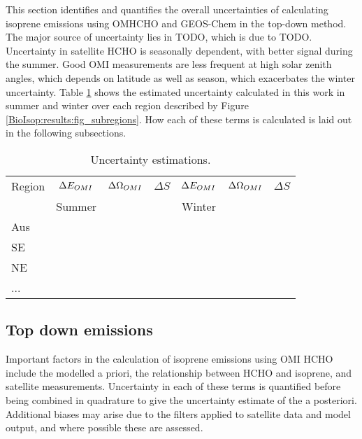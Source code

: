   This section identifies and quantifies the overall uncertainties of calculating isoprene emissions using OMHCHO and GEOS-Chem in the top-down method.
  The major source of uncertainty lies in TODO, which is due to TODO.
  Uncertainty in satellite HCHO is seasonally dependent, with better signal during the summer. 
  Good OMI measurements are less frequent at high solar zenith angles, which depends on latitude as well as season, which exacerbates the winter uncertainty.
  Table \ref{BioIsop:uncertainty:tab_uncertainties} shows the estimated uncertainty calculated in this work in summer and winter over each region described by Figure \ref{BioIsop:results:fig_subregions}.
  How each of these terms is calculated is laid out in the following subsections.
  
  \begin{table}\begin{threeparttable}
      \caption{Uncertainty estimations.}
      \begin{tabular}{ l | c  c  c | c c c} 
        \toprule
        Region & $\Delta E_{OMI}$ & $\Delta \Omega_{OMI}$ & $\Delta S$ 
          & $\Delta E_{OMI}$ & $\Delta \Omega_{OMI}$ & $\Delta S$ \\
         & Summer & & & Winter & & \\
        \midrule
          Aus & & & & & & \\
          SE & & & & & & \\
          NE & & & & & & \\
          ... & & & & & & \\
        \bottomrule
      \end{tabular}
      \label{BioIsop:uncertainty:tab_uncertainties}
    \end{threeparttable}\end{table}
    
    
  
  \subsection{Top down emissions}
    \label{BioIsop:uncertainty:eomi}
    
    Important factors in the calculation of isoprene emissions using OMI HCHO include the modelled a priori, the relationship between HCHO and isoprene, and satellite measurements.
    Uncertainty in each of these terms is quantified before being combined in quadrature to give the uncertainty estimate of the a posteriori.
    Additional biases may arise due to the filters applied to satellite data and model output, and where possible these are assessed. 
    
